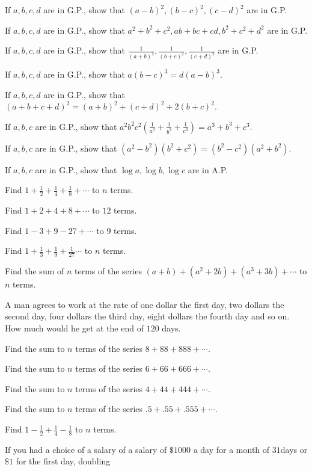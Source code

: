 \item If $a, b, c, d$ are in G.P., show that $(a - b)^2, (b - c)^2, (c - d)^2$ are in G.P.
\item If $a, b, c, d$ are in G.P., show that $a^2 + b^2 + c^2, ab + bc + cd, b^2 + c^2 + d^2$ are in G.P.
\item If $a, b, c, d$ are in G.P., show that $\frac{1}{(a + b)^2}, \frac{1}{(b + c)^2}, \frac{1}{(c + d)^2}$ are in G.P.
\item If $a, b, c, d$ are in G.P., show that $a(b - c)^3 = d(a - b)^3$.
\item If $a, b, c, d$ are in G.P., show that $(a + b + c + d)^2 = (a + b)^2 + (c + d)^2 + 2(b + c)^2$.
\item If $a, b, c$ are in G.P., show that $a^2b^2c^2\left(\frac{1}{a^3} + \frac{1}{b^3} + \frac{1}{c^3}\right) = a^3 + b^3 + c^3$.
\item If $a, b, c$ are in G.P., show that $(a^2 - b^2)(b^2 + c^2) = (b^2 - c^2)(a^2 + b^2)$.
\item If $a, b, c$ are in G.P., show that $\log a, \log b, \log c$ are in A.P.
\item Find $1 + \frac{1}{2} + \frac{1}{4} + \frac{1}{8} + \cdots$ to $n$ terms.
\item Find $1 + 2 + 4 + 8 + \cdots$ to $12$ terms.
\item Find $1 - 3 + 9 - 27 + \cdots$ to $9$ terms.
\item Find $1 + \frac{1}{3} + \frac{1}{9} + \frac{1}{27} \cdots$ to $n$ terms.
\item Find the sum of $n$ terms of the series $(a + b) + (a^2 + 2b) + (a^3 + 3b) + \cdots$ to $n$ terms.
\item A man agrees to work at the rate of one dollar the first day, two dollars the second day, four dollars the third day, eight
  dollars the fourth day and so on. How much would he get at the end of $120$ days.
\item Find the sum to $n$ terms of the series $8 + 88 + 888 + \cdots$.
\item  Find the sum to $n$ terms of the series $6 + 66 + 666 + \cdots$.
\item Find the sum to $n$ terms of the series $4 + 44 + 444 + \cdots$.
\item Find the sum to $n$ terms of the series $.5 + .55 + .555 + \cdots$.
\item Find $1 - \frac{1}{2} + \frac{1}{4} - \frac{1}{8}$ to $n$ terms.
\item If you had a choice of a salary of a salary of $\$ 1000$ a day for a month of $31$days or $\$ 1$ for the first day, doubling

